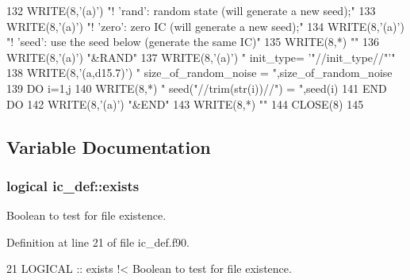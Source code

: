\begin{DoxyCode}
132     \textcolor{keyword}{WRITE}(8,\textcolor{stringliteral}{'(a)'}) \textcolor{stringliteral}{"!        'rand': random state (will generate a new seed);"}
133     \textcolor{keyword}{WRITE}(8,\textcolor{stringliteral}{'(a)'}) \textcolor{stringliteral}{"!        'zero': zero IC (will generate a new seed);"}
134     \textcolor{keyword}{WRITE}(8,\textcolor{stringliteral}{'(a)'}) \textcolor{stringliteral}{"!        'seed': use the seed below (generate the same IC)"}
135     \textcolor{keyword}{WRITE}(8,*) \textcolor{stringliteral}{""}
136     \textcolor{keyword}{WRITE}(8,\textcolor{stringliteral}{'(a)'}) \textcolor{stringliteral}{"&RAND"}
137     \textcolor{keyword}{WRITE}(8,\textcolor{stringliteral}{'(a)'}) \textcolor{stringliteral}{"  init\_type= '"}//init\_type//\textcolor{stringliteral}{"'"} 
138     \textcolor{keyword}{WRITE}(8,\textcolor{stringliteral}{'(a,d15.7)'}) \textcolor{stringliteral}{"  size\_of\_random\_noise = "},size\_of\_random\_noise
139     \textcolor{keywordflow}{DO} i=1,j
140        \textcolor{keyword}{WRITE}(8,*) \textcolor{stringliteral}{" seed("}//trim(str(i))//\textcolor{stringliteral}{") = "},seed(i)
141 \textcolor{keywordflow}{    END DO}
142     \textcolor{keyword}{WRITE}(8,\textcolor{stringliteral}{'(a)'}) \textcolor{stringliteral}{"&END"}
143     \textcolor{keyword}{WRITE}(8,*) \textcolor{stringliteral}{""}
144     \textcolor{keyword}{CLOSE}(8)
145     
\end{DoxyCode}


\subsection{Variable Documentation}
\subsubsection[{\texorpdfstring{exists}{exists}}]{\setlength{\rightskip}{0pt plus 5cm}logical ic\+\_\+def\+::exists\hspace{0.3cm}{\ttfamily [private]}}\hypertarget{namespaceic__def_a989b031664e87b1a693a329ecd4f4721}{}\label{namespaceic__def_a989b031664e87b1a693a329ecd4f4721}


Boolean to test for file existence. 



Definition at line 21 of file ic\+\_\+def.\+f90.


\begin{DoxyCode}
21   \textcolor{keywordtype}{LOGICAL} :: exists\textcolor{comment}{ !< Boolean to test for file existence.}
\end{DoxyCode}
